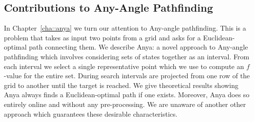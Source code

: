 \subsection{Contributions to Any-Angle Pathfinding}
In Chapter~\ref{cha::anya} we turn our attention to Any-angle pathfinding.
This is a problem that takes as input two points from a grid and asks for a
Euclidean-optimal path connecting them. We describe Anya: a novel approach to
Any-angle pathfinding which involves considering sets of states together as an
interval. From each interval we select a single representative point which we
use to compute an $f$-value for the entire set.  During search intervals are
projected from one row of the grid to another until the target is reached. We
give theoretical results showing Anya always finds a Euclidean-optimal path if
one exists. Moreover, Anya does so entirely online and without any
pre-processing.  We are unaware of another other approach which guarantees
 these desirable characteristics.
